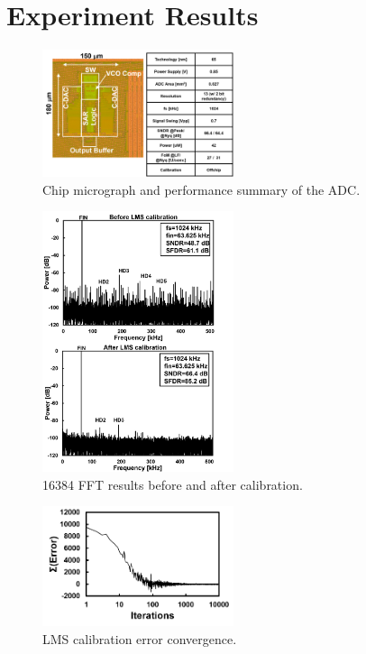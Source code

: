 \documentclass[letterpaper, 10 pt, conference]{ieeeconf}  %
\begin{document}
\section{Experiment Results}
\begin{figure}[ht!]
\centering
 \includegraphics[width=0.5\textwidth]{figs/chipphoto.png}
  \captionsetup{font=footnotesize}
  \caption{Chip micrograph and performance summary of the ADC.}
  \label{chipphoto}
\end{figure}

\begin{figure}[ht!]
\centering
 \includegraphics[width=0.5\textwidth]{figs/fft.png}
  \captionsetup{font=footnotesize}
  \caption{16384 FFT results before and after calibration.}
  \label{aftercal}
\end{figure}

\begin{figure}[ht!]
\centering
 \includegraphics[width=0.5\textwidth]{figs/lms.png}
  \captionsetup{font=footnotesize}
  \caption{LMS calibration error convergence.}
  \label{lms}
\end{figure}
\end{document}
